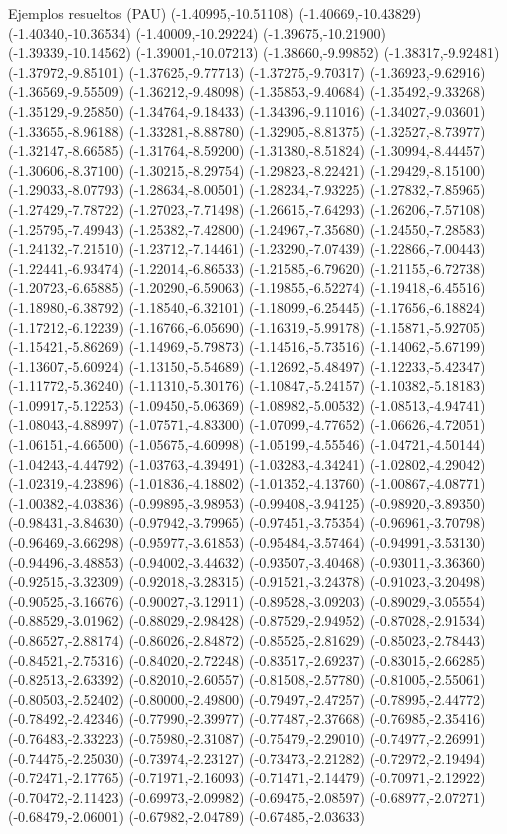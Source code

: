 \documentclass[11pt,a4paper]{article}
\begin{document}
\begin{fmex}{Ejemplos resueltos (PAU)}
(-1.40995,-10.51108) (-1.40669,-10.43829) (-1.40340,-10.36534) (-1.40009,-10.29224) (-1.39675,-10.21900) (-1.39339,-10.14562) (-1.39001,-10.07213) (-1.38660,-9.99852) (-1.38317,-9.92481) (-1.37972,-9.85101) (-1.37625,-9.77713) (-1.37275,-9.70317) (-1.36923,-9.62916) (-1.36569,-9.55509) (-1.36212,-9.48098) (-1.35853,-9.40684) (-1.35492,-9.33268) (-1.35129,-9.25850) (-1.34764,-9.18433) (-1.34396,-9.11016) (-1.34027,-9.03601) (-1.33655,-8.96188) (-1.33281,-8.88780) (-1.32905,-8.81375) (-1.32527,-8.73977) (-1.32147,-8.66585) (-1.31764,-8.59200) (-1.31380,-8.51824) (-1.30994,-8.44457) (-1.30606,-8.37100) (-1.30215,-8.29754) (-1.29823,-8.22421) (-1.29429,-8.15100) (-1.29033,-8.07793) (-1.28634,-8.00501) (-1.28234,-7.93225) (-1.27832,-7.85965) (-1.27429,-7.78722) (-1.27023,-7.71498) (-1.26615,-7.64293) (-1.26206,-7.57108) (-1.25795,-7.49943) (-1.25382,-7.42800) (-1.24967,-7.35680) (-1.24550,-7.28583) (-1.24132,-7.21510) (-1.23712,-7.14461) (-1.23290,-7.07439) (-1.22866,-7.00443) (-1.22441,-6.93474) (-1.22014,-6.86533) (-1.21585,-6.79620) (-1.21155,-6.72738) (-1.20723,-6.65885) (-1.20290,-6.59063) (-1.19855,-6.52274) (-1.19418,-6.45516) (-1.18980,-6.38792) (-1.18540,-6.32101) (-1.18099,-6.25445) (-1.17656,-6.18824) (-1.17212,-6.12239) (-1.16766,-6.05690) (-1.16319,-5.99178) (-1.15871,-5.92705) (-1.15421,-5.86269) (-1.14969,-5.79873) (-1.14516,-5.73516) (-1.14062,-5.67199) (-1.13607,-5.60924) (-1.13150,-5.54689) (-1.12692,-5.48497) (-1.12233,-5.42347) (-1.11772,-5.36240) (-1.11310,-5.30176) (-1.10847,-5.24157) (-1.10382,-5.18183) (-1.09917,-5.12253) (-1.09450,-5.06369) (-1.08982,-5.00532) (-1.08513,-4.94741) (-1.08043,-4.88997) (-1.07571,-4.83300) (-1.07099,-4.77652) (-1.06626,-4.72051) (-1.06151,-4.66500) (-1.05675,-4.60998) (-1.05199,-4.55546) (-1.04721,-4.50144) (-1.04243,-4.44792) (-1.03763,-4.39491) (-1.03283,-4.34241) (-1.02802,-4.29042) (-1.02319,-4.23896) (-1.01836,-4.18802) (-1.01352,-4.13760) (-1.00867,-4.08771) (-1.00382,-4.03836) (-0.99895,-3.98953) (-0.99408,-3.94125) (-0.98920,-3.89350) (-0.98431,-3.84630) (-0.97942,-3.79965) (-0.97451,-3.75354) (-0.96961,-3.70798) (-0.96469,-3.66298) (-0.95977,-3.61853) (-0.95484,-3.57464) (-0.94991,-3.53130) (-0.94496,-3.48853) (-0.94002,-3.44632) (-0.93507,-3.40468) (-0.93011,-3.36360) (-0.92515,-3.32309) (-0.92018,-3.28315) (-0.91521,-3.24378) (-0.91023,-3.20498) (-0.90525,-3.16676) (-0.90027,-3.12911) (-0.89528,-3.09203) (-0.89029,-3.05554) (-0.88529,-3.01962) (-0.88029,-2.98428) (-0.87529,-2.94952) (-0.87028,-2.91534) (-0.86527,-2.88174) (-0.86026,-2.84872) (-0.85525,-2.81629) (-0.85023,-2.78443) (-0.84521,-2.75316) (-0.84020,-2.72248) (-0.83517,-2.69237) (-0.83015,-2.66285) (-0.82513,-2.63392) (-0.82010,-2.60557) (-0.81508,-2.57780) (-0.81005,-2.55061) (-0.80503,-2.52402) (-0.80000,-2.49800) (-0.79497,-2.47257) (-0.78995,-2.44772) (-0.78492,-2.42346) (-0.77990,-2.39977) (-0.77487,-2.37668) (-0.76985,-2.35416) (-0.76483,-2.33223) (-0.75980,-2.31087) (-0.75479,-2.29010) (-0.74977,-2.26991) (-0.74475,-2.25030) (-0.73974,-2.23127) (-0.73473,-2.21282) (-0.72972,-2.19494) (-0.72471,-2.17765) (-0.71971,-2.16093) (-0.71471,-2.14479) (-0.70971,-2.12922) (-0.70472,-2.11423) (-0.69973,-2.09982) (-0.69475,-2.08597) (-0.68977,-2.07271) (-0.68479,-2.06001) (-0.67982,-2.04789) (-0.67485,-2.03633) 
\end{fmex}
\end{document}
